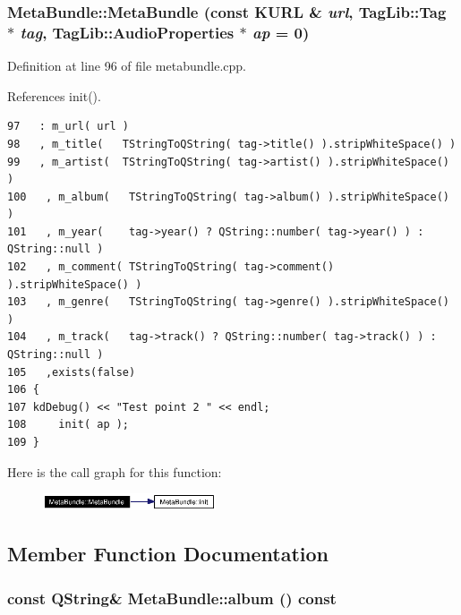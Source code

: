 \subsubsection{\setlength{\rightskip}{0pt plus 5cm}Meta\-Bundle::Meta\-Bundle (const KURL \& {\em url}, Tag\-Lib::Tag $\ast$ {\em tag}, Tag\-Lib::Audio\-Properties $\ast$ {\em ap} = 0)}\label{classMetaBundle_MetaBundlea3}




Definition at line 96 of file metabundle.cpp.

References init().



\footnotesize\begin{verbatim}97   : m_url( url )
98   , m_title(   TStringToQString( tag->title() ).stripWhiteSpace() )
99   , m_artist(  TStringToQString( tag->artist() ).stripWhiteSpace() )
100   , m_album(   TStringToQString( tag->album() ).stripWhiteSpace() )
101   , m_year(    tag->year() ? QString::number( tag->year() ) : QString::null )
102   , m_comment( TStringToQString( tag->comment() ).stripWhiteSpace() )
103   , m_genre(   TStringToQString( tag->genre() ).stripWhiteSpace() )
104   , m_track(   tag->track() ? QString::number( tag->track() ) : QString::null )
105   ,exists(false)
106 {
107 kdDebug() << "Test point 2 " << endl;
108     init( ap );
109 }
\end{verbatim}\normalsize 


Here is the call graph for this function:\begin{figure}[H]
\begin{center}
\leavevmode
\includegraphics[width=145pt]{classMetaBundle_MetaBundlea3_cgraph}
\end{center}
\end{figure}


\subsection{Member Function Documentation}
\subsubsection{\setlength{\rightskip}{0pt plus 5cm}const QString\& Meta\-Bundle::album () const\hspace{0.3cm}{\tt  [inline]}}\label{classMetaBundle_MetaBundlea12}




